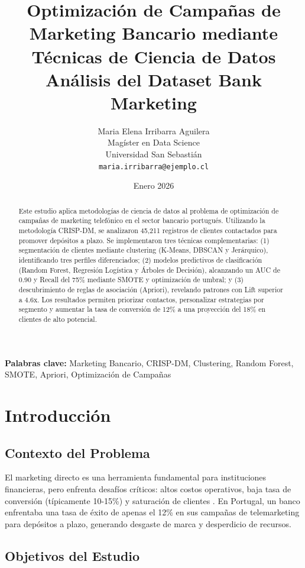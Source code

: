\documentclass[12pt,letterpaper]{article}
\title{\textbf{Optimización de Campañas de Marketing Bancario mediante Técnicas de Ciencia de Datos}\\
\large{Análisis del Dataset Bank Marketing}}
\author{Maria Elena Irribarra Aguilera\\
Magíster en Data Science\\
Universidad San Sebastián\\
\texttt{maria.irribarra@ejemplo.cl}}
\date{Enero 2026}
\begin{document}
\maketitle

\begin{abstract}
Este estudio aplica metodologías de ciencia de datos al problema de optimización de campañas de marketing telefónico en el sector bancario portugués. Utilizando la metodología CRISP-DM, se analizaron 45,211 registros de clientes contactados para promover depósitos a plazo. Se implementaron tres técnicas complementarias: (1) segmentación de clientes mediante clustering (K-Means, DBSCAN y Jerárquico), identificando tres perfiles diferenciados; (2) modelos predictivos de clasificación (Random Forest, Regresión Logística y Árboles de Decisión), alcanzando un AUC de 0.90 y Recall del 75\% mediante SMOTE y optimización de umbral; y (3) descubrimiento de reglas de asociación (Apriori), revelando patrones con Lift superior a 4.6x. Los resultados permiten priorizar contactos, personalizar estrategias por segmento y aumentar la tasa de conversión de 12\% a una proyección del 18\% en clientes de alto potencial.
\end{abstract}

\textbf{Palabras clave:} Marketing Bancario, CRISP-DM, Clustering, Random Forest, SMOTE, Apriori, Optimización de Campañas

\newpage
\tableofcontents
\newpage

\section{Introducción}

\subsection{Contexto del Problema}

El marketing directo es una herramienta fundamental para instituciones financieras, pero enfrenta desafíos críticos: altos costos operativos, baja tasa de conversión (típicamente 10-15\%) y saturación de clientes \cite{moro2014}. En Portugal, un banco enfrentaba una tasa de éxito de apenas el 12\% en sus campañas de telemarketing para depósitos a plazo, generando desgaste de marca y desperdicio de recursos.

\subsection{Objetivos del Estudio}
\end{document}

